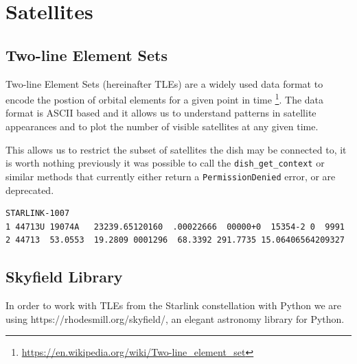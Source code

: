 \documentclass[IN,11pt,twoside,openright,bachelor,english]{tumthesis}
\begin{document}
\chapter{Satellites}
\label{chap:sats}

\section{Two-line Element Sets}
Two-line Element Sets (hereinafter TLEs) are a widely used data format to encode the postion of orbital elements for a given point in time \footnote{\url{https://en.wikipedia.org/wiki/Two-line_element_set}}. The data format is ASCII based and it allows us to understand patterns in satellite appearances and to plot the number of visible satellites at any given time. 

This allows us to restrict the subset of satellites the dish may be connected to, it is worth nothing previously it was possible to call the \texttt{dish\_get\_context} or similar methods that currently either return a \texttt{PermissionDenied} error, or are deprecated.

\begin{lstlisting}[caption={TLE for satellite STARLINK-1007 },captionpos=b]
STARLINK-1007           
1 44713U 19074A   23239.65120160  .00022666  00000+0  15354-2 0  9991
2 44713  53.0553  19.2809 0001296  68.3392 291.7735 15.06406564209327
\end{lstlisting}

	
\section{Skyfield Library}

In order to work with TLEs from the Starlink constellation with Python we are using https://rhodesmill.org/skyfield/, an elegant astronomy library for Python.



\end{document}
